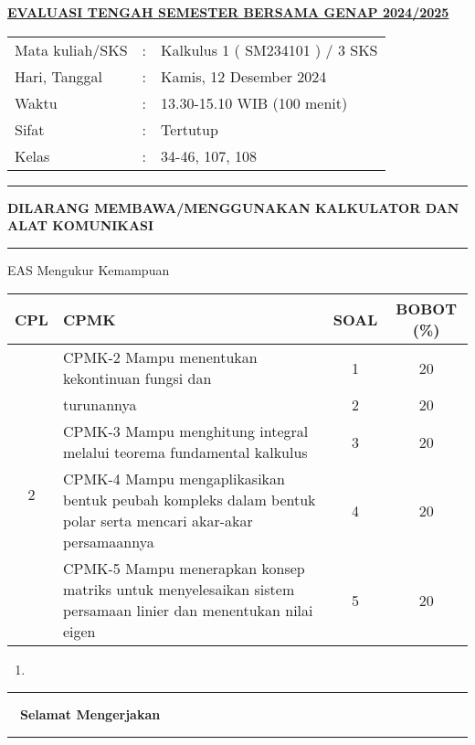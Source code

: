 \documentclass[10pt,openany,a4paper]{article}
\begin{document}
    \begin{center}
	{\underline{\textbf{\MakeUppercase{Evaluasi Tengah Semester Bersama Genap 2024/2025}}}}
    \end{center}

    \begin{center}
	\begin{tabular}{lcl}
		Mata kuliah/SKS & : & Kalkulus 1 ( SM234101 ) / 3 SKS\\
		Hari, Tanggal & : & Kamis, 12 Desember 2024\\
		Waktu & : & 13.30-15.10 WIB (100 menit)\\
		Sifat & : & Tertutup\\
		Kelas & : & 34-46, 107, 108
	\end{tabular}
    \end{center}
	
    \noindent\rule{\textwidth}{2.pt}
	
    \setlength{\parindent}{5pt}
    \setlength{\parindent}{5pt}
    \setlength{\parindent}{5pt}
    \par \textbf{\MakeUppercase{dilarang membawa/menggunakan kalkulator dan alat komunikasi}}
    \par {}
    \noindent\rule{\textwidth}{2.pt}
    
	\begin{table}[h]
        \centering
        EAS Mengukur Kemampuan
        \begin{tabular}{|c|m{10.5cm}|c|c|}
            \hline
            CPL & CPMK & SOAL & BOBOT (\%) \\ \hline
            \multirow{5}{*}{2} 
            & CPMK-2 Mampu menentukan kekontinuan fungsi dan & 1 & 20 \\ \cline{3-4}
            & turunannya & 2 & 20 \\\cline{2-4}
            & CPMK-3 Mampu menghitung integral melalui teorema fundamental kalkulus & 3 & 20 \\ \cline{2-4}
            & CPMK-4 Mampu mengaplikasikan bentuk peubah kompleks dalam bentuk polar serta mencari akar-akar persamaannya & 4 & 20 \\ \cline{2-4}
            & CPMK-5 Mampu menerapkan konsep matriks untuk menyelesaikan sistem persamaan linier dan menentukan nilai eigen & 5 & 20 \\ \hline
        \end{tabular}
    \end{table}
    \begin{enumerate}
        \item 
    \end{enumerate}
    \begin{center}
        \rule{0.28\textwidth}{2.pt}$\quad$\textbf{Selamat Mengerjakan}$\quad$\rule{0.28\textwidth}{2.pt}
    \end{center}
\end{document}
